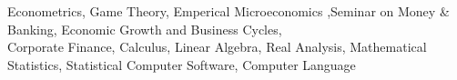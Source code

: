 

\begin{cvparagraph}

Econometrics, Game Theory, Emperical Microeconomics ,Seminar on Money \& Banking, Economic Growth and Business Cycles, \\ Corporate Finance, 
Calculus, Linear Algebra, Real Analysis, Mathematical Statistics, Statistical Computer Software, Computer Language\\ 
\vspace{-5mm}
\end{cvparagraph}
